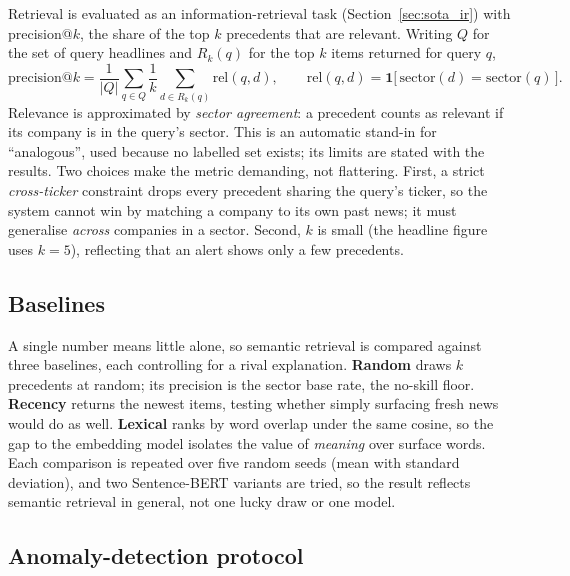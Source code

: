 Retrieval is evaluated as an information-retrieval task (Section~\ref{sec:sota_ir}) with precision@$k$, the
share of the top $k$ precedents that are relevant. Writing $Q$ for the set of query headlines and $R_k(q)$
for the top $k$ items returned for query $q$,
\begin{equation}
\text{precision@}k = \frac{1}{|Q|}\sum_{q\in Q}\frac{1}{k}\sum_{d\in R_k(q)} \mathrm{rel}(q,d),
\qquad
\mathrm{rel}(q,d)=\mathbf{1}\big[\,\mathrm{sector}(d)=\mathrm{sector}(q)\,\big].
\label{eq:precatk}
\end{equation}
Relevance is approximated by \emph{sector agreement}: a precedent counts as relevant if its company is in
the query's sector. This is an automatic stand-in for ``analogous'', used because no labelled set exists;
its limits are stated with the results. Two choices make the metric demanding, not flattering. First, a
strict \emph{cross-ticker} constraint drops every precedent sharing the query's ticker, so the system
cannot win by matching a company to its own past news; it must generalise \emph{across} companies in a
sector. Second, $k$ is small (the headline figure uses $k=5$), reflecting that an alert shows only a few
precedents.

\subsection{Baselines}
\label{sec:met_eval_baselines}

A single number means little alone, so semantic retrieval is compared against three baselines, each
controlling for a rival explanation. \textbf{Random} draws $k$ precedents at random; its precision is the
sector base rate, the no-skill floor. \textbf{Recency} returns the newest items, testing whether simply
surfacing fresh news would do as well. \textbf{Lexical} ranks by word overlap under the same cosine, so the
gap to the embedding model isolates the value of \emph{meaning} over surface words. Each comparison is
repeated over five random seeds (mean with standard deviation), and two Sentence-BERT variants are tried,
so the result reflects semantic retrieval in general, not one lucky draw or one model.

\subsection{Anomaly-detection protocol}
\label{sec:met_eval_anomaly}

